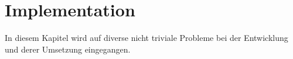 \section{Implementation}
In diesem Kapitel wird auf diverse nicht triviale Probleme bei der Entwicklung und derer Umsetzung eingegangen. \\





